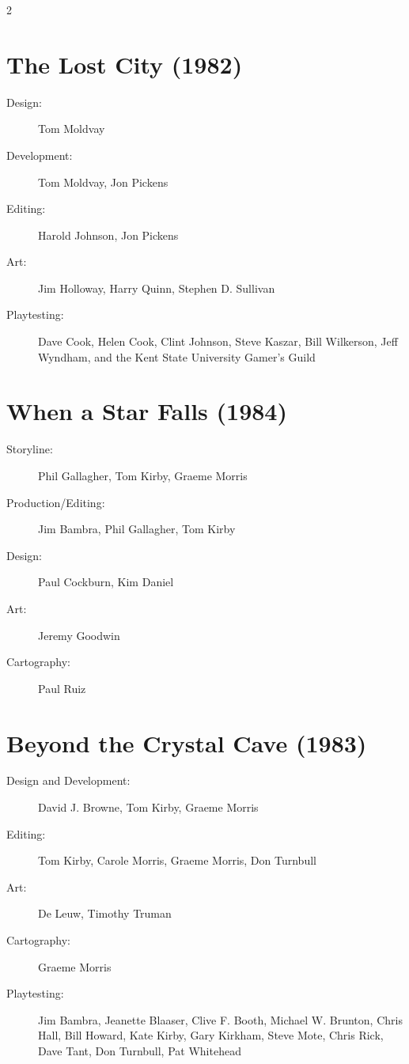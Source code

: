 \documentclass[10pt,a4paper,twoside,bg=print,twocolumn,openany,nodeprecatedcode]{dndbook}
\begin{document}
\begin{description}
\begin{multicols}{2}
\section{The Lost City (1982)}

\begin{description}
\item[Design:]
Tom Moldvay
\item[Development:]
Tom Moldvay, Jon Pickens
\item[Editing:]
Harold Johnson, Jon Pickens
\item[Art:]
Jim Holloway, Harry Quinn, Stephen D. Sullivan
\item[Playtesting:]
Dave Cook, Helen Cook, Clint Johnson, Steve Kaszar, Bill Wilkerson, Jeff Wyndham, and the Kent State University Gamer's Guild
\end{description}

\section{When a Star Falls (1984)}

\begin{description}
\item[Storyline:]
Phil Gallagher, Tom Kirby, Graeme Morris
\item[Production/Editing:]
Jim Bambra, Phil Gallagher, Tom Kirby
\item[Design:]
Paul Cockburn, Kim Daniel
\item[Art:]
Jeremy Goodwin
\item[Cartography:]
Paul Ruiz
\end{description}

\section{Beyond the Crystal Cave (1983)}

\begin{description}
\item[Design and Development:]
David J. Browne, Tom Kirby, Graeme Morris
\item[Editing:]
Tom Kirby, Carole Morris, Graeme Morris, Don Turnbull
\item[Art:]
De Leuw, Timothy Truman
\item[Cartography:]
Graeme Morris
\item[Playtesting:]
Jim Bambra, Jeanette Blaaser, Clive F. Booth, Michael W. Brunton, Chris Hall, Bill Howard, Kate Kirby, Gary Kirkham, Steve Mote, Chris Rick, Dave Tant, Don Turnbull, Pat Whitehead
\end{description}


\end{multicols}
\end{description}
\end{document}
